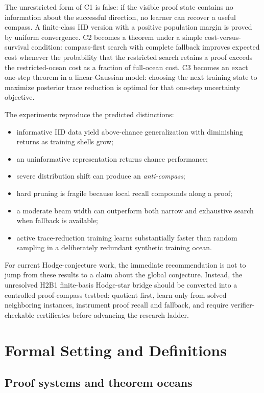 \documentclass[11pt]{article}
\begin{document}
The unrestricted form of C1 is false: if the visible proof state contains no information about the successful direction, no learner can recover a useful compass. A finite-class IID version with a positive population margin is proved by uniform convergence. C2 becomes a theorem under a simple cost-versus-survival condition: compass-first search with complete fallback improves expected cost whenever the probability that the restricted search retains a proof exceeds the restricted-ocean cost as a fraction of full-ocean cost. C3 becomes an exact one-step theorem in a linear-Gaussian model: choosing the next training state to maximize posterior trace reduction is optimal for that one-step uncertainty objective.

The experiments reproduce the predicted distinctions:
\begin{itemize}
\item informative IID data yield above-chance generalization with diminishing returns as training shells grow;
\item an uninformative representation returns chance performance;
\item severe distribution shift can produce an \emph{anti-compass};
\item hard pruning is fragile because local recall compounds along a proof;
\item a moderate beam width can outperform both narrow and exhaustive search when fallback is available;
\item active trace-reduction training learns substantially faster than random sampling in a deliberately redundant synthetic training ocean.
\end{itemize}

For current Hodge-conjecture work, the immediate recommendation is not to jump from these results to a claim about the global conjecture. Instead, the unresolved H2B1 finite-basis Hodge-star bridge should be converted into a controlled proof-compass testbed: quotient first, learn only from solved neighboring instances, instrument proof recall and fallback, and require verifier-checkable certificates before advancing the research ladder.

\section{Formal Setting and Definitions}

\subsection{Proof systems and theorem oceans}
\end{document}
